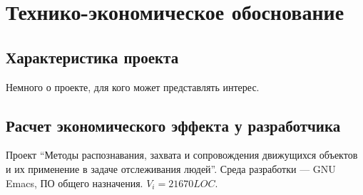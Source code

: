 \section{Технико-экономическое обоснование}

\subsection{Характеристика проекта}
Немного о проекте, для кого может представлять интерес.

\subsection{Расчет экономического эффекта у разработчика}
Проект ``Методы распознавания, захвата и сопровождения движущихся объектов и их применение в задаче отслеживания людей''. Среда разработки --- GNU Emacs, ПО общего назначения. \( V_i = 21670 LOC \).
